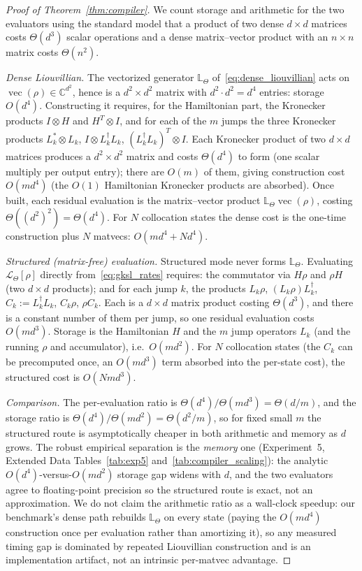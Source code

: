 \documentclass[11pt]{article}
\newcommand{\C}{\mathbb{C}}
\newcommand{\calL}{\mathcal{L}}
\begin{document}
\begin{proof}[Proof of Theorem~\ref{thm:compiler}]
We count storage and arithmetic for the two evaluators using the standard model that a product of two dense $d\times d$ matrices costs $\Theta(d^3)$ scalar operations and a dense matrix--vector product with an $n\times n$ matrix costs $\Theta(n^2)$.

\emph{Dense Liouvillian.} The vectorized generator $\mathbb{L}_\Theta$ of~\eqref{eq:dense_liouvillian} acts on $\operatorname{vec}(\rho)\in\C^{d^2}$, hence is a $d^2\times d^2$ matrix with $d^2\cdot d^2=d^4$ entries: storage $O(d^4)$. Constructing it requires, for the Hamiltonian part, the Kronecker products $I\otimes H$ and $H^T\otimes I$, and for each of the $m$ jumps the three Kronecker products $L_k^*\otimes L_k$, $I\otimes L_k^\dagger L_k$, $(L_k^\dagger L_k)^T\otimes I$. Each Kronecker product of two $d\times d$ matrices produces a $d^2\times d^2$ matrix and costs $\Theta(d^4)$ to form (one scalar multiply per output entry); there are $O(m)$ of them, giving construction cost $O(md^4)$ (the $O(1)$ Hamiltonian Kronecker products are absorbed). Once built, each residual evaluation is the matrix--vector product $\mathbb{L}_\Theta\operatorname{vec}(\rho)$, costing $\Theta((d^2)^2)=\Theta(d^4)$. For $N$ collocation states the dense cost is the one-time construction plus $N$ matvecs: $O(md^4+Nd^4)$.

\emph{Structured (matrix-free) evaluation.} Structured mode never forms $\mathbb{L}_\Theta$. Evaluating $\calL_\Theta[\rho]$ directly from~\eqref{eq:gksl_rates} requires: the commutator via $H\rho$ and $\rho H$ (two $d\times d$ products); and for each jump $k$, the products $L_k\rho$, $(L_k\rho)L_k^\dagger$, $C_k:=L_k^\dagger L_k$, $C_k\rho$, $\rho C_k$. Each is a $d\times d$ matrix product costing $\Theta(d^3)$, and there is a constant number of them per jump, so one residual evaluation costs $O(md^3)$. Storage is the Hamiltonian $H$ and the $m$ jump operators $L_k$ (and the running $\rho$ and accumulator), i.e.\ $O(md^2)$. For $N$ collocation states (the $C_k$ can be precomputed once, an $O(md^3)$ term absorbed into the per-state cost), the structured cost is $O(Nmd^3)$.

\emph{Comparison.} The per-evaluation ratio is $\Theta(d^4)/\Theta(md^3)=\Theta(d/m)$, and the storage ratio is $\Theta(d^4)/\Theta(md^2)=\Theta(d^2/m)$, so for fixed small $m$ the structured route is asymptotically cheaper in both arithmetic and memory as $d$ grows. The robust empirical separation is the \emph{memory} one (Experiment~5, Extended Data Tables~\ref{tab:exp5} and~\ref{tab:compiler_scaling}): the analytic $O(d^4)$-versus-$O(md^2)$ storage gap widens with $d$, and the two evaluators agree to floating-point precision so the structured route is exact, not an approximation. We do not claim the arithmetic ratio as a wall-clock speedup: our benchmark's dense path rebuilds $\mathbb{L}_\Theta$ on every state (paying the $O(md^4)$ construction once per evaluation rather than amortizing it), so any measured timing gap is dominated by repeated Liouvillian construction and is an implementation artifact, not an intrinsic per-matvec advantage.
\end{proof}
\end{document}
